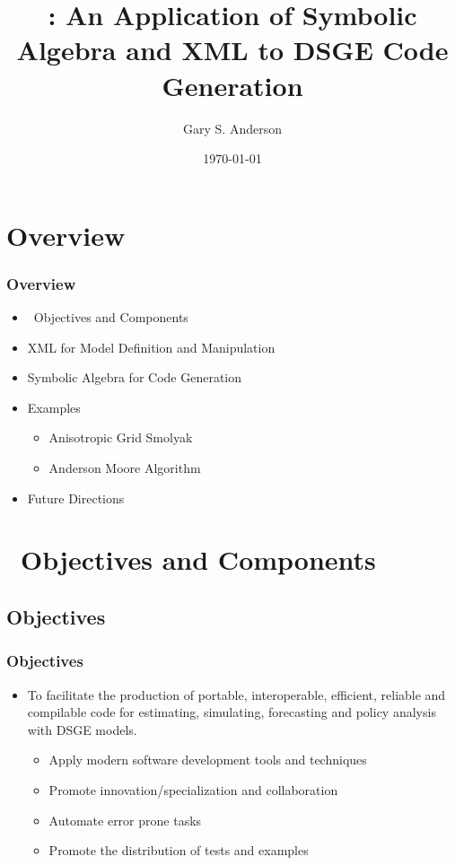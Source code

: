 \documentclass[tikz]{beamer}
\begin{document}
\title[Symbolic Algebra/XML and Code Generation]{\dsgecg: An Application of Symbolic Algebra and XML to DSGE Code Generation}


\author{Gary S. Anderson}
\date{\today} 


\frame{\titlepage}


\section{Overview}



\begin{frame}
  \frametitle{Overview}
  
  \begin{itemize}
  \item \dsgecg\  Objectives and Components
  \item XML for Model Definition and Manipulation
  \item Symbolic Algebra for Code Generation
  \item Examples
    \begin{itemize}
    \item Anisotropic Grid Smolyak
    \item Anderson Moore Algorithm 
    \end{itemize}
  \item Future Directions
  \end{itemize}
\end{frame}

\section{\dsgecg\  Objectives and Components}

\subsection{Objectives}


\begin{frame}
  \frametitle{Objectives}  

{%
\begin{itemize}
\item To facilitate  
the production of  portable, interoperable, efficient, 
 reliable and compilable code  for estimating,  
simulating,  forecasting and  policy analysis with
DSGE models.
  \begin{itemize}
  \item Apply modern software development tools and techniques
  \item Promote innovation/specialization and collaboration 
  \item Automate error prone tasks
  \item Promote the distribution of tests and examples
  \end{itemize}
\end{itemize}
}
\end{frame}
\end{document}
